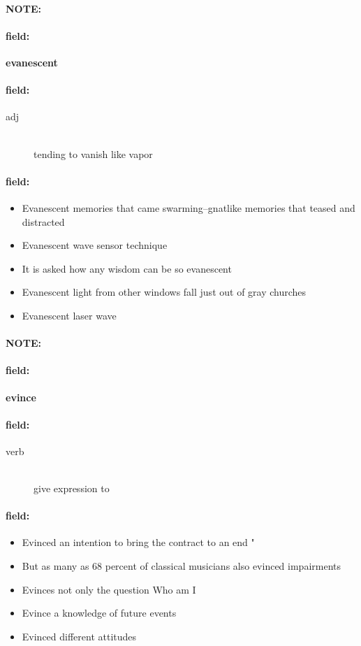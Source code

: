 \documentclass[12pt]{article}
\newenvironment{note}{\paragraph{NOTE:}}{}
\newenvironment{field}{\paragraph{field:}}{}
\begin{document}
\begin{note}
\begin{field}
\textbf{\large evanescent}
\end{field}


\begin{field}
\begin{description}
\item[adj] \hfill \\ 
tending to vanish like vapor

\end{description}
\end{field}

\begin{field}
\begin{itemize}
\item Evanescent memories that came swarming--gnatlike memories that teased and distracted
\item Evanescent wave sensor technique
\item It is asked how any wisdom can be so evanescent
\item Evanescent light from other windows fall just out of gray churches
\item Evanescent laser wave
\end{itemize}
\end{field}
\end{note}
\begin{note}
\begin{field}
\textbf{\large evince}
\end{field}


\begin{field}
\begin{description}
\item[verb] \hfill \\ 
give expression to

\end{description}
\end{field}

\begin{field}
\begin{itemize}
\item Evinced an intention to bring the contract to an end " 
\item But as many as 68 percent of classical musicians also evinced impairments
\item Evinces not only the question Who am I
\item Evince a knowledge of future events
\item Evinced different attitudes
\end{itemize}
\end{field}
\end{note}
\end{document}

